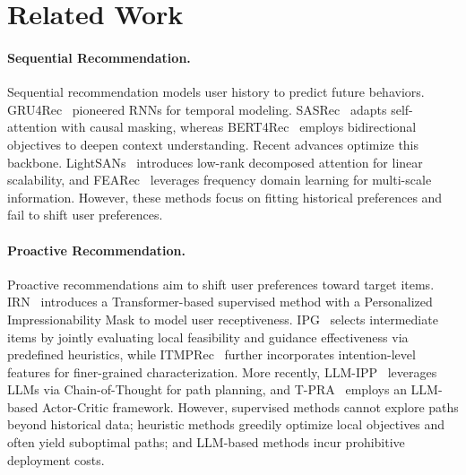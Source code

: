 \section{Related Work}
\paragraph{Sequential Recommendation.}
Sequential recommendation models user history to predict future behaviors. GRU4Rec~\cite{hidasi2015session} pioneered RNNs for temporal modeling. SASRec~\cite{kang2018self} adapts self-attention with causal masking, whereas BERT4Rec~\cite{sun2019bert4rec} employs bidirectional objectives to deepen context understanding. Recent advances optimize this backbone. LightSANs~\cite{fan2021lighter} introduces low-rank decomposed attention for linear scalability, and FEARec~\cite{du2023frequency} leverages frequency domain learning for multi-scale information. However, these methods focus on fitting historical preferences and fail to shift user preferences.

\paragraph{Proactive Recommendation.}
Proactive recommendations aim to shift user preferences toward target items. IRN~\cite{zhu2023influential} introduces a Transformer-based supervised method with a Personalized Impressionability Mask to model user receptiveness. IPG~\cite{bi2024proactive} selects intermediate items by jointly evaluating local feasibility and guidance effectiveness via predefined heuristics, while ITMPRec~\cite{lian2025itmprec} further incorporates intention-level features for finer-grained characterization. More recently, LLM-IPP~\cite{wang2025leveraging} leverages LLMs via Chain-of-Thought for path planning, and T-PRA~\cite{wang2025tunable} employs an LLM-based Actor-Critic framework. However, supervised methods cannot explore paths beyond historical data; heuristic methods greedily optimize local objectives and often yield suboptimal paths; and LLM-based methods incur prohibitive deployment costs.